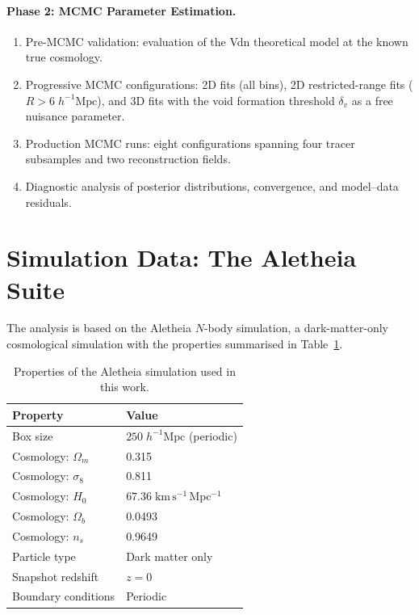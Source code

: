 \documentclass[12pt]{report}
\begin{document}
\paragraph{Phase 2: MCMC Parameter Estimation.}
\begin{enumerate}
    \item Pre-MCMC validation: evaluation of the Vdn theoretical model at the known true cosmology.
    \item Progressive MCMC configurations: 2D fits (all bins), 2D restricted-range fits ($R > 6\;h^{-1}\mathrm{Mpc}$), and 3D fits with the void formation threshold $\delta_v$ as a free nuisance parameter.
    \item Production MCMC runs: eight configurations spanning four tracer subsamples and two reconstruction fields.
    \item Diagnostic analysis of posterior distributions, convergence, and model--data residuals.
\end{enumerate}


\section{Simulation Data: The Aletheia Suite}
\label{sec:aletheia}

The analysis is based on the Aletheia $N$-body simulation, a dark-matter-only cosmological simulation with the properties summarised in Table~\ref{tab:aletheia}.

\begin{table}[H]
    \centering
    \caption{Properties of the Aletheia simulation used in this work.}
    \label{tab:aletheia}
    \begin{tabular}{ll}
        \toprule
        \textbf{Property} & \textbf{Value} \\
        \midrule
        Box size           & $250\;h^{-1}\mathrm{Mpc}$ (periodic) \\
        Cosmology: $\Omega_m$ & 0.315 \\
        Cosmology: $\sigma_8$ & 0.811 \\
        Cosmology: $H_0$   & $67.36\;\mathrm{km\,s^{-1}\,Mpc^{-1}}$ \\
        Cosmology: $\Omega_b$ & 0.0493 \\
        Cosmology: $n_s$   & 0.9649 \\
        Particle type      & Dark matter only \\
        Snapshot redshift  & $z = 0$ \\
        Boundary conditions & Periodic \\
        \bottomrule
    \end{tabular}
\end{table}
\end{document}
